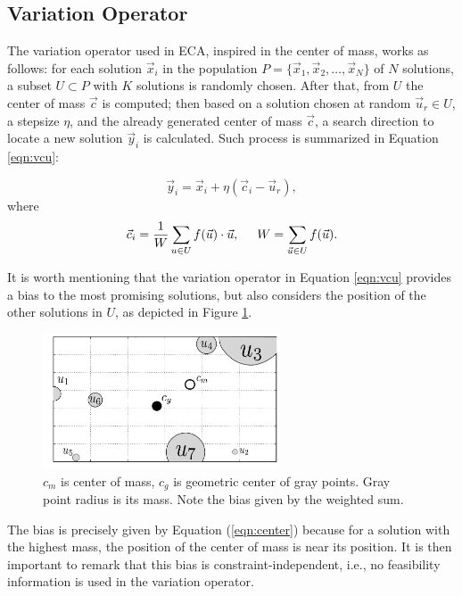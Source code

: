 \documentclass[conference]{IEEEtran}
\begin{document}
\subsection{Variation Operator} %
\label{sub:algorithm_description}

The variation operator used in ECA, inspired in the center of mass, works as follows: 
for each solution $\vec{x}_i $ in the population $P = \{ \vec{x}_1, \vec{x}_2, \ldots, \vec{x}_{N} \} $ of $N$ 
solutions, a subset $U \subset P $ with $K$ solutions is randomly chosen. After 
that, from $U$ the center of mass $\vec{c}$ is computed; then based on  a solution 
chosen at random $\vec{u}_r \in U$, a stepsize $\eta$, and the already generated 
center of mass $\vec{c}$, a search direction to locate a new solution $ \vec{y}_i$ 
is calculated. Such process is summarized in Equation \ref{eqn:vcu}:

\begin{equation}
	\vec{y}_i = \vec{x}_i + \eta ( \vec{c}_i - \vec{u}_{r} ),
	\label{eqn:vcu}
\end{equation}
%
where 
%
\begin{equation}
	\vec{c}_i = \dfrac{1} {W} \sum_{u \in U} f(\vec{u}) \cdot \vec{u} , 
			\hspace{0.5cm} 
			W = \sum_{ \vec{u} \in U} f(\vec{u}).
	\label{eqn:center}
\end{equation}

It is worth mentioning that the variation operator in Equation \ref{eqn:vcu} 
provides a bias to the most promising solutions, but also considers the position 
of the other solutions in $U$, as depicted in  Figure \ref{fig:masses}. 

\begin{figure}[!ht]
	\centering
	\includegraphics[width=7cm]{img/masses.pdf}
	\caption{$c_m$ is center of mass, $c_g$ is geometric center of gray points. %
	Gray point radius is its mass. Note the bias given by the weighted sum.}
	\label{fig:masses}       %
\end{figure}
%
%
The bias is precisely given by Equation (\ref{eqn:center}) because for a solution 
with the highest mass, the position of the center of mass is near  
its position. It is then important to remark that this bias is constraint-independent, i.e., 
no feasibility information is used in the variation operator. 
%
\end{document}
